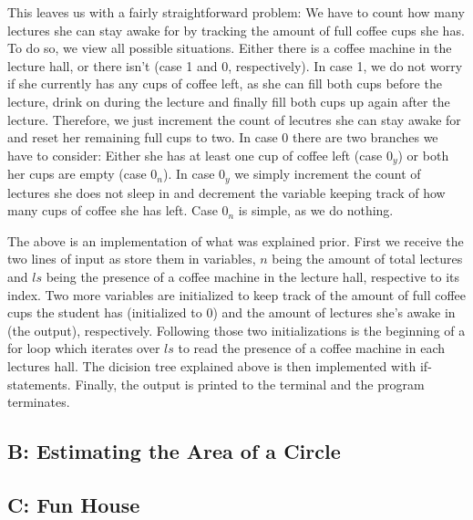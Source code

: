 \documentclass{article}
\begin{document}
This leaves us with a fairly straightforward problem: We have to count how many lectures she can stay awake for by tracking the amount of full coffee cups she has. To do so, we view all possible situations. Either there is a coffee machine in the lecture hall, or there isn't (case 1 and 0, respectively). In case 1, we do not worry if she currently has any cups of coffee left, as she can fill both cups before the lecture, drink on during the lecture and finally fill both cups up again after the lecture. Therefore, we just increment the count of lecutres she can stay awake for and reset her remaining full cups to two. In case 0 there are two branches we have to consider: Either she has at least one cup of coffee left (case $0_y$) or both her cups are empty (case $0_n$). In case $0_y$ we simply increment the count of lectures she does not sleep in and decrement the variable keeping track of how many cups of coffee she has left. Case $0_n$ is simple, as we do nothing.



The above is an implementation of what was explained prior. First we receive the two lines of input as store them in variables, $n$ being the amount of total lectures and $ls$ being the presence of a coffee machine in the lecture hall, respective to its index. Two more variables are initialized to keep track of the amount of full coffee cups the student has (initialized to 0) and the amount of lectures she's awake in (the output), respectively. Following those two initializations is the beginning of a for loop which iterates over $ls$ to read the presence of a coffee machine in each lectures hall. The dicision tree explained above is then implemented with if-statements. Finally, the output is printed to the terminal and the program terminates.

\subsection{B: Estimating the Area of a Circle}



\subsection{C: Fun House}


\end{document}
